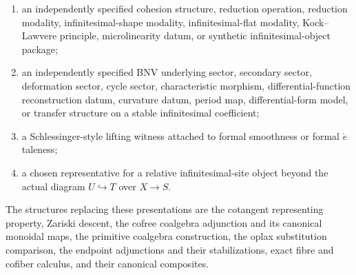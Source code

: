\begin{theorem}
\begin{enumerate}[label=(\roman*)]
    constructed from pullback and cofreedom;
    \item an independently specified cohesion structure, reduction operation,
    reduction modality, infinitesimal-shape modality, infinitesimal-flat
    modality, Kock--Lawvere principle, microlinearity datum, or synthetic
    infinitesimal-object package;
    \item an independently specified BNV underlying sector, secondary sector,
    deformation sector, cycle sector, characteristic morphism,
    differential-function reconstruction datum, curvature datum, period map,
    differential-form model, or transfer structure on a stable infinitesimal
    coefficient;
    \item a Schlessinger-style lifting witness attached to formal smoothness or
    formal \(\acute{e}\)taleness;
    \item a chosen representative for a relative infinitesimal-site object
    beyond the actual diagram \(U\hookrightarrow T\) over \(X\to S\).
\end{enumerate}
The structures replacing these presentations are the cotangent representing
property, Zariski descent, the cofree coalgebra adjunction and its canonical
monoidal maps, the primitive coalgebra construction, the oplax substitution
comparison, the endpoint adjunctions and their stabilizations, exact fibre and
cofiber calculus, and their canonical composites.
\end{theorem}

